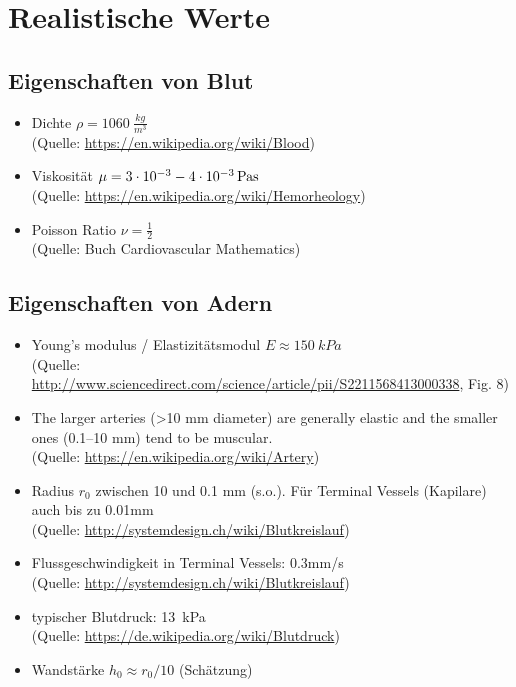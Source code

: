 \documentclass[a4paper,12pt]{scrartcl}
\begin{document}
\section*{Realistische Werte}
\subsection*{Eigenschaften von Blut}
\begin{itemize}
  \item Dichte $\rho = \SI{1060}{\frac{kg}{m^3}}$\\
  (Quelle: \url{https://en.wikipedia.org/wiki/Blood})

  \item Viskosität $\mu = \SI{3E-3}{} - \SI{4e-3}{Pa s}$\\
  (Quelle: \url{https://en.wikipedia.org/wiki/Hemorheology})

  \item Poisson Ratio $\nu = \frac{1}{2}$\\
  (Quelle: Buch Cardiovascular Mathematics)

\end{itemize}
\subsection*{Eigenschaften von Adern}
\begin{itemize}
  \item Young's modulus / Elastizitätsmodul $E \approx \SI{150}{kPa}$\\
  (Quelle: \url{http://www.sciencedirect.com/science/article/pii/S2211568413000338}, Fig. 8)
  \item
  The larger arteries (>10 mm diameter) are generally elastic and the smaller ones (0.1–10 mm) tend to be muscular.\\
  (Quelle: \url{https://en.wikipedia.org/wiki/Artery})
  \item Radius $r_0$ zwischen 10 und 0.1 mm (s.o.). Für Terminal Vessels (Kapilare) auch bis zu 0.01mm\\
  (Quelle: \url{http://systemdesign.ch/wiki/Blutkreislauf})
  \item Flussgeschwindigkeit in Terminal Vessels: 0.3mm/s\\
  (Quelle: \url{http://systemdesign.ch/wiki/Blutkreislauf})
  \item typischer Blutdruck: \SI{13}{kPa}\\
  (Quelle: \url{https://de.wikipedia.org/wiki/Blutdruck})
  \item Wandstärke $h_0 \approx r_0 / 10$ (Schätzung)
\end{itemize}
\end{document}
